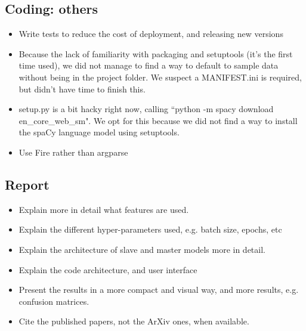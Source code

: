 \documentclass[11pt, oneside]{article}   	%
\begin{document}
\subsection{Coding: others}

\begin{itemize}
\item Write tests to reduce the cost of deployment, and releasing new versions
\item Because the lack of familiarity with packaging and setuptools (it's the first time used), we did not manage to find a way to default to sample data without being in the project folder. We suspect a \textsf{MANIFEST.ini} is required, but didn't have time to finish this.
\item \textsf{setup.py} is a bit hacky right now, calling ``\textsf{python -m spacy download en\_core\_web\_sm}". We opt for this because we did not find a way to install the spaCy language model using \textsf{setuptools}.
\item Use \textsf{Fire} rather than argparse

\end{itemize}

\subsection{Report}

\begin{itemize}
\item Explain more in detail what features are used.
\item Explain the different hyper-parameters used, e.g. batch size, epochs, etc
\item Explain the architecture of slave and master models more in detail.
\item Explain the code architecture, and user interface
\item Present the results in a more compact and visual way, and more results, e.g. confusion matrices.
\item Cite the published papers, not the ArXiv ones, when available.
\end{itemize}

%


\end{document}
